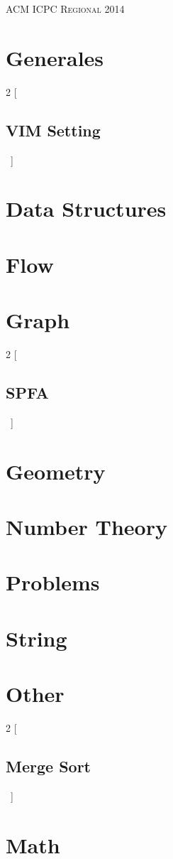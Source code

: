 \documentclass[a4paper]{amsart}
\newcommand{\includecpp}[3]{
  \begin{multicols}{2}
    [\subsection{#1}\ ]
    
  \end{multicols}
}
\begin{document}
  \thispagestyle{fancy}
  \begin{center}
    \Huge\textsc{ACM ICPC Regional 2014}
  \end{center}

  \section{Generales}
   \includecpp{VIM Setting}{./Generales}{vimrc.cpp}
 
  \section{Data Structures}

  \section{Flow}
  
  \section{Graph}
   \includecpp{SPFA}{./Graph}{spfa.cpp}
  
  \section{Geometry}   
    
  \section{Number Theory}

  \section{Problems}
       
  \section{String}

  \section{Other}
   \includecpp{Merge Sort}{./Other}{Mergesort.cpp}
     

  \section{Math}
\end{document}
